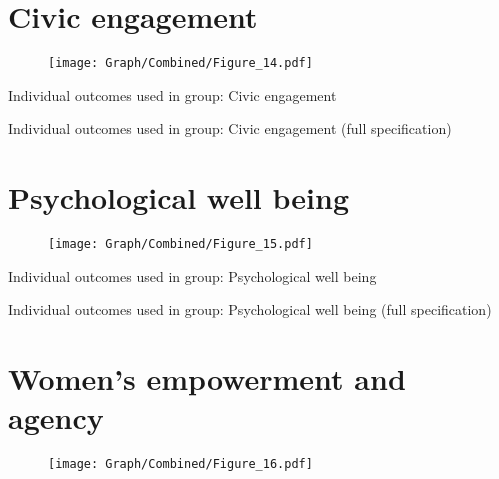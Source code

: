 \documentclass[10pt,a4paper]{article}
\begin{document}
\section{Civic engagement}
\begin{table}[H]\centering

\end{table}
\begin{figure}[H]\centering
\texttt{[image: Graph/Combined/Figure\_14.pdf]}
\caption{} \label{fig:Fig_14}
\end{figure}

\begin{table}[H]\centering\caption{Individual outcomes used in group: Civic engagement }
\resizebox{\textwidth}{!}{}
\end{table}
\begin{table}[H]\centering\caption{Individual outcomes used in group: Civic engagement (full specification)}
\resizebox{\textwidth}{!}{}
\end{table}
\pagebreak
\section{Psychological well being}
\begin{table}[H]\centering

\end{table}
\begin{figure}[H]\centering
\texttt{[image: Graph/Combined/Figure\_15.pdf]}
\caption{} \label{fig:Fig_15}
\end{figure}

\begin{table}[H]\centering\caption{Individual outcomes used in group: Psychological well being }
\resizebox{\textwidth}{!}{}
\end{table}
\begin{table}[H]\centering\caption{Individual outcomes used in group: Psychological well being (full specification)}
\resizebox{\textwidth}{!}{}
\end{table}
\pagebreak
\section{Women's empowerment and agency}
\begin{table}[H]\centering

\end{table}
\begin{figure}[H]\centering
\texttt{[image: Graph/Combined/Figure\_16.pdf]}
\caption{} \label{fig:Fig_16}
\end{figure}
\end{document}
